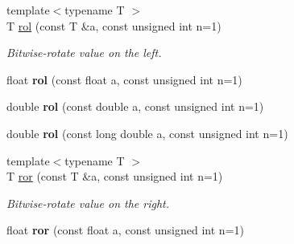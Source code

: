 \begin{DoxyCompactItemize}
\mbox{\label{namespacecimg__library__suffixed_1_1cimg_a1ead565c35064488c8a56fce858da674}} 
{\footnotesize template$<$typename T $>$ }\\T \hyperlink{namespacecimg__library__suffixed_1_1cimg_a1ead565c35064488c8a56fce858da674}{rol} (const T \&a, const unsigned int n=1)
\begin{DoxyCompactList}\small\item\em Bitwise-\/rotate value on the left. \end{DoxyCompactList}\item 
\mbox{\label{namespacecimg__library__suffixed_1_1cimg_afb7d512cc0b5473301a060131bd415af}} 
float {\bfseries rol} (const float a, const unsigned int n=1)
\item 
\mbox{\label{namespacecimg__library__suffixed_1_1cimg_a4263e5084b1303cc58b50650366bab36}} 
double {\bfseries rol} (const double a, const unsigned int n=1)
\item 
\mbox{\label{namespacecimg__library__suffixed_1_1cimg_aeee82dc035ff6c75d8b05530771090d3}} 
double {\bfseries rol} (const long double a, const unsigned int n=1)
\item 
\mbox{\label{namespacecimg__library__suffixed_1_1cimg_ab616eb52e66e664293d16a9bcfa9a9b4}} 
{\footnotesize template$<$typename T $>$ }\\T \hyperlink{namespacecimg__library__suffixed_1_1cimg_ab616eb52e66e664293d16a9bcfa9a9b4}{ror} (const T \&a, const unsigned int n=1)
\begin{DoxyCompactList}\small\item\em Bitwise-\/rotate value on the right. \end{DoxyCompactList}\item 
\mbox{\label{namespacecimg__library__suffixed_1_1cimg_a0cc69aa64bca2114676aebf2f689e5e8}} 
float {\bfseries ror} (const float a, const unsigned int n=1)
\item 
\mbox{\label{namespacecimg__library__suffixed_1_1cimg_a4ac3e4e4369af3c0f7a40fb4ef435e82}} 

\end{DoxyCompactItemize}
